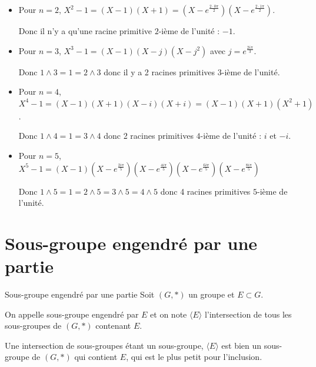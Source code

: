 \begin{exemple}
    \begin{itemize}
        \item Pour $n = 2$, $X^2 - 1 = (X - 1)(X + 1) = \left(X - e^{\frac{2 \cdot 0 \pi} 2}\right)\left(X - e^{\frac{2 \cdot 1 \pi}2}\right)$.

        Donc il n'y a qu'une racine primitive $2$-ième de l'unité : $-1$.
    
        \item Pour $n = 3$, $X^3 - 1 = (X - 1)(X - j)(X - j^2)$ avec $j = e^{\frac{2i\pi}3}$.
        
        Donc $1 \wedge 3 = 1 = 2 \wedge 3$ donc il y a 2 racines primitives $3$-ième de l'unité.

        \item Pour $n = 4$, $X^4 - 1 = (X - 1)(X + 1)(X - i)(X + i) = (X - 1)(X + 1)(X^2 + 1)$.
        
        Donc $1 \wedge 4 = 1 = 3 \wedge 4$ donc 2 racines primitives $4$-ième de l'unité : $i$ et $-i$.
    
        \item Pour $n = 5$, $X^5 - 1 = (X - 1)\left(X - e^{\frac{2i\pi}5}\right)\left(X - e^{\frac{4i\pi}5}\right)\left(X - e^{\frac{6i\pi}5}\right)\left(X - e^{\frac{8i\pi}5}\right)$

        Donc $1 \wedge 5 = 1 = 2 \wedge 5 = 3 \wedge 5 = 4 \wedge 5$ donc 4 racines primitives $5$-ième de l'unité.
    \end{itemize}
\end{exemple}

\section{Sous-groupe engendré par une partie}

\begin{definition}{Sous-groupe engendré par une partie}{}
    Soit $(G, \ast)$ un groupe et $E \subset G$.

    On appelle sous-groupe engendré par $E$ et on note $\langle E \rangle$
    l'intersection de tous les sous-groupes de $(G, \ast)$ contenant $E$.
\end{definition}

\begin{remarque}
    Une intersection de sous-groupes étant un sous-groupe, $\langle E \rangle$ est bien un sous-groupe de $(G, \ast)$
    qui contient $E$, qui est le plus petit pour l'inclusion.
\end{remarque}

